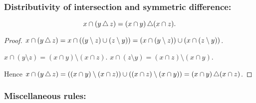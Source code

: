 \documentclass[../../set-theory.ftl.tex]{subfiles}
\begin{document}
  \subsubsection*{Distributivity of intersection and symmetric difference:}

  \begin{forthel}
    \begin{proposition}\label{SetTheory_01_04_751668}
      \[ x \cap (y \mathop{\triangle} z) = (x \cap y) \mathop{\triangle} (x \cap z). \]
    \end{proposition}
    \begin{proof}
      $x \cap (y \mathop{\triangle} z) = x \cap ((y \setminus z) \cup (z \setminus y)) =
      (x \cap (y \setminus z)) \cup (x \cap (z \setminus y))$.

      $x \cap (y \setminus z) = (x \cap y) \setminus (x \cap z)$.
      $x \cap (z \setminus y) = (x \cap z) \setminus (x \cap y)$.

      Hence $x \cap (y \mathop{\triangle} z) = ((x \cap y) \setminus (x \cap z)) \cup
      ((x \cap z) \setminus (x \cap y)) = (x \cap y) \mathop{\triangle} (x \cap z)$.
    \end{proof}
  \end{forthel}


  \subsubsection*{Miscellaneous rules:}
\end{document}
